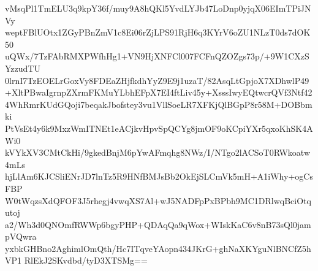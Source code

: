 vMsqPl1TmELU3q9kpY36f/muy9A8hQKl5YvdLYJb47LoDnp0yjqX06EImTPiJNVy
weptFBlUOtx1ZGyPBnZmV1c8Ei06rZjLPS91RjH6q3KYrV6oZU1NLzT0ds7dOK50
uQWx/7TzFAbRMXPWfhHg1+VN9HjXNFCl007FCFnQZOZgs73p/+9W1CXzSYzzudTU
0lrnI7TzEOELrGoxVy8FDEaZHjfkdhYyZ9E9j1uzaT/82AsqLtGpjoX7XDhwlP49
+XltPBwaIgrnpZXrmFKMuYLbhEFpX7EI4ftLiv45y+XsssIwyEQtwcrQVf3Ntf42
4WhRmrKUdGQoji7beqakJbofstey3vu1VllSoeLR7XFKjQlBGpP8r58M+DOBbmki
PtVsEt4y6k9MxzWmITNEt1eACjkvHpvSpQCYg8jmOF9oKCpiYXr5qxoKhSK4AWi0
kVYkXV3CMtCkHi/9gkedBnjM6pYwAFmqhg8NWz/I/NTgo2lACSoT0RWkoatw4mLs
hjLlAm6KJCSliENrJD7lnTz5R9HNfBMJsBb2OkEjSLCmVk5mH+A1iWhy+ogCsFBP
W0tWqzsXdQFOF3J5rhegj4vwqXS7Al+wJ5NADFpPxBPbh9MC1DRlwqBciOtqutoj
a2/Wh3d0QNOmfRWWp6bgyPHP+QDAqQa9qWox+WIskKaC6v8nB73sQl0jampVQwra
yxbkGHBno2AghimlOmQth/Hc7ITqveYAopn434JKrG+ghNaXKYguNlBNCfZ5hVP1
RlEkJ2SKvdbd/tyD3XTSMg==
